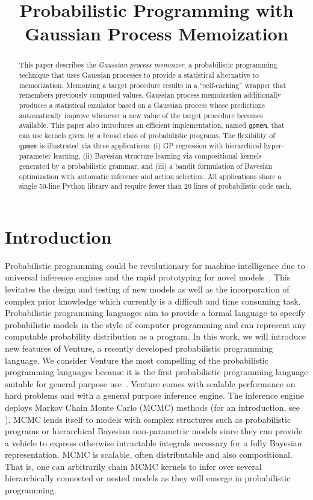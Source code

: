 \documentclass{article} %
\title{Probabilistic Programming with Gaussian Process Memoization}
\author{
}
\begin{document}
\maketitle

\begin{abstract}
This paper describes the {\em Gaussian process memoizer}, a probabilistic programming technique that uses Gaussian processes to provide a statistical alternative to memorization. Memoizing a target procedure results in a “self-caching” wrapper that remembers previously computed values. Gaussian process memoization additionally produces a statistical emulator based on a Gaussian process whose predictions automatically improve whenever a new value of the target procedure becomes available. This paper also introduces  an efficient implementation, named {\tt gpmem}, that can use kernels given by a broad class of probabilistic programs. The flexibility of {\tt gpmem} is illustrated via three applications: (i) GP regression with hierarchical hyper-parameter learning, (ii) Bayesian structure learning via compositional kernels generated by a probabilistic grammar, and (iii) a bandit formulation of Bayesian optimization with automatic inference and action selection. All applications share a single 50-line Python library and require fewer than 20 lines of probabilistic code each.
\end{abstract}

\section{Introduction}
Probabilistic programming could be revolutionary for machine intelligence due to universal inference engines and the rapid prototyping for novel models~\citep{ghahramani2015probabilistic}. This levitates the design and testing of new models as well as the incorporation of complex prior knowledge which currently is a difficult and time consuming task. Probabilistic programming languages aim to provide a formal language to specify probabilistic models in the style of computer programming and can represent any computable probability distribution as a program. In this work, we will introduce new features of Venture, a recently developed probabilistic programming language. We consider Venture the most compelling of the probabilistic programming languages because it is the first probabilistic programming language suitable for general purpose use~\citep{mansinghka2014venture}. Venture comes with scalable performance on hard problems and with a general purpose inference engine. The inference engine deploys Markov Chain Monte Carlo (MCMC) methods (for an introduction, see \citet*{andrieu2003introduction}). MCMC lends itself to models with complex structures such as probabilistic programs or hierarchical Bayesian non-parametric models since they can provide a vehicle to express otherwise intractable integrals necessary for a fully Bayesian representation. MCMC is scalable, often distributable and also compositional. That is, one can arbitrarily chain MCMC kernels to infer over several hierarchically connected or nested models as they will emerge in probabilistic programming.
\end{document}
